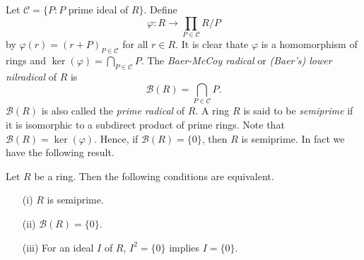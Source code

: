 Let $\mathcal{C}=\{ P : P$ prime ideal of $R\}$. Define
\[
\varphi\colon R\rightarrow \prod_{P\in\mathcal{C}}R/P
\]
by $\varphi (r)=(r+P)_{P\in\mathcal{C}}$ for all $r\in R$. It is clear thate $\varphi$ 
is a homomorphism of rings and $\ker(\varphi
)=\bigcap_{P\in \mathcal{C}}P$. The \emph{Baer-McCoy radical} or \emph{(Baer's) lower nilradical} of $R$ is
$$\mathcal{B}(R)=\bigcap_{P\in\mathcal{C}}P.$$
$\mathcal{B}(R)$ is also called the \emph{prime radical} of $R$.
A ring $R$ is said to be \emph{semiprime} if it is isomorphic to a subdirect product of prime rings.
Note that $\mathcal{B}(R)=\ker(\varphi)$. Hence, if $\mathcal{B}(R)=\{0\}$, then $R$ is semiprime. 
In fact we have the following result.

\begin{theorem}\label{Teorema 1.3.6}
Let $R$ be a ring. Then the following conditions are equivalent.
\begin{itemize}\item[(i)] $R$ is semiprime.
\item[(ii)] $\mathcal{B}(R)=\{0\}$.
\item[(iii)] For an ideal $I$ of $R$, $I^2=\{0\}$ implies $I=\{0\}$.
\end{itemize}
\end{theorem}

